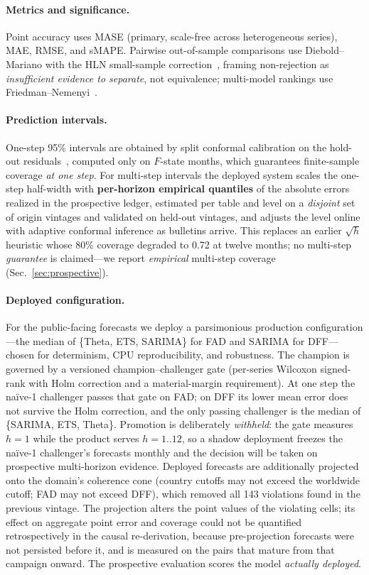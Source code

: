 \documentclass[runningheads]{llncs}
\newcommand{\smape}{sMAPE}
\begin{document}
\paragraph{Metrics and significance.} Point accuracy uses MASE (primary, scale-free
across heterogeneous series), MAE, RMSE, and \smape. Pairwise out-of-sample
comparisons use Diebold--Mariano with the HLN small-sample
correction~\cite{diebold1995,harvey1997}, framing non-rejection as
\emph{insufficient evidence to separate}, not equivalence; multi-model rankings use
Friedman--Nemenyi~\cite{demsar2006}.

\paragraph{Prediction intervals.} One-step 95\% intervals are obtained by split
conformal calibration on the hold-out residuals~\cite{vovk2005}, computed only on
$F$-state months, which guarantees finite-sample coverage \emph{at one step}. For
multi-step intervals the deployed system scales the one-step half-width with
\textbf{per-horizon empirical quantiles} of the absolute errors realized in the
prospective ledger, estimated per table and level on a \emph{disjoint} set of
origin vintages and validated on held-out vintages, and adjusts the level online
with adaptive conformal inference as bulletins arrive. This replaces an earlier
$\sqrt{h}$ heuristic whose 80\% coverage degraded to 0.72 at twelve months; no
multi-step \emph{guarantee} is claimed---we report \emph{empirical} multi-step
coverage (Sec.~\ref{sec:prospective}).

\paragraph{Deployed configuration.} For the public-facing forecasts we deploy a
parsimonious production configuration---the median of \{Theta, ETS, SARIMA\} for FAD
and SARIMA for DFF---chosen for determinism, CPU reproducibility, and robustness.
The champion is governed by a versioned champion--challenger gate
(per-series Wilcoxon signed-rank with Holm correction and a material-margin
requirement). At one step the naïve-1 challenger passes that gate on FAD; on DFF its
lower mean error does not survive the Holm correction, and the only passing challenger
is the median of \{SARIMA, ETS, Theta\}. Promotion is deliberately \emph{withheld}: the
gate measures $h=1$ while the product serves $h=1..12$, so a shadow deployment freezes
the naïve-1 challenger's forecasts monthly and the decision will be taken on
prospective multi-horizon evidence. Deployed forecasts are additionally projected onto the domain's coherence
cone (country cutoffs may not exceed the worldwide cutoff; FAD may not exceed DFF),
which removed all 143 violations found in the previous vintage. The projection alters
the point values of the violating cells; its effect on aggregate point error and
coverage could not be quantified retrospectively in the causal re-derivation, because
pre-projection forecasts were not persisted before it, and is measured on the pairs that
mature from that campaign onward. The prospective evaluation scores the model \emph{actually deployed}.
\end{document}
